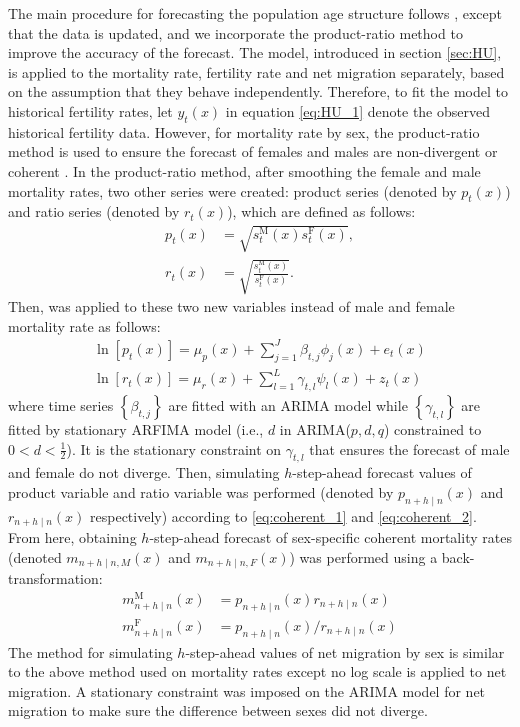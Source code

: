 \documentclass[11pt,a4paper,]{article}
\begin{document}
The main procedure for forecasting the population age structure follows \textcite{HB08}, except that the data is updated, and we incorporate the product-ratio method \autocite{HBY13} to improve the accuracy of the forecast. The \textcite{HU07} model, introduced in section \ref{sec:HU}, is applied to the mortality rate, fertility rate and net migration separately, based on the assumption that they behave independently. Therefore, to fit the model to historical fertility rates, let \(y_t(x)\) in equation \eqref{eq:HU_1} denote the observed historical fertility data. However, for mortality rate by sex, the product-ratio method is used to ensure the forecast of females and males are non-divergent or coherent \autocite{HBY13}. In the product-ratio method, after smoothing the female and male mortality rates, two other series were created: product series (denoted by \(p_t(x)\)) and ratio series (denoted by \(r_t(x)\)), which are defined as follows:
\vspace{-.4in}
\begin{align}
  p_t(x)&=\sqrt{s_{t}^{\text{M}}(x)s_{t}^{\text{F}}(x)}, \label{eq:coherent_1}\\
  r_t(x)&=\sqrt{\frac{s_{t}^{\text{M}}(x)}{s_{t}^{\text{F}}(x)}}. \label{eq:coherent_2}
\end{align}
Then, \textcite{HU07} was applied to these two new variables instead of male and female mortality rate as follows:
\vspace{-.3in}
\begin{align*}
  \ln[p_t(x)]=\mu_p(x)+\sum_{j=1}^{J}\beta_{t,j}\phi_j(x)+e_t(x)\\
  \ln[r_t(x)]=\mu_r(x)+\sum_{l=1}^{L}\gamma_{t,l}\psi_l(x)+z_t(x)
\end{align*}
where time series \(\left\{\beta_{t,j}\right\}\) are fitted with an ARIMA model while \(\left\{\gamma_{t,l}\right\}\) are fitted by stationary ARFIMA model (i.e., \(d\) in ARIMA(\(p,d,q\)) constrained to \(0<d<\frac{1}{2}\)). It is the stationary constraint on \(\gamma_{t,l}\) that ensures the forecast of male and female do not diverge. Then, simulating \(h\)-step-ahead forecast values of product variable and ratio variable was performed (denoted by \(p_{n+h\mid n}(x)\) and \(r_{n+h\mid n}(x)\) respectively) according to \eqref{eq:coherent_1} and \eqref{eq:coherent_2}. From here, obtaining \(h\)-step-ahead forecast of sex-specific coherent mortality rates (denoted \(m_{n+h\mid n,M}(x)\) and \(m_{n+h\mid n,F}(x)\)) was performed using a back-transformation:
\vspace{-.3in}
\begin{align*}
  m_{n+h\mid n}^{\text{M}}(x) & = p_{n+h\mid n}(x)r_{n+h\mid n}(x)\\
  m_{n+h\mid n}^{\text{F}}(x) & = p_{n+h\mid n}(x)/r_{n+h\mid n}(x)
\end{align*}
The method for simulating \(h\)-step-ahead values of net migration by sex is similar to the above method used on mortality rates except no log scale is applied to net migration. A stationary constraint was imposed on the ARIMA model for net migration to make sure the difference between sexes did not diverge.
\end{document}
